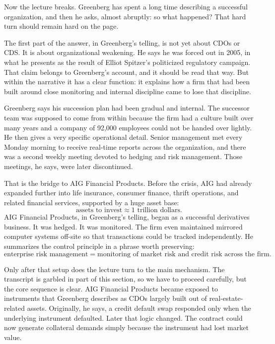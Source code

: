 Now the lecture breaks. Greenberg has spent a long time describing a successful organization, and then he asks, almost abruptly: so what happened? That hard turn should remain hard on the page.

The first part of the answer, in Greenberg's telling, is not yet about CDOs or CDS. It is about organizational weakening. He says he was forced out in 2005, in what he presents as the result of Elliot Spitzer's politicized regulatory campaign. That claim belongs to Greenberg's account, and it should be read that way. But within the narrative it has a clear function: it explains how a firm that had been built around close monitoring and internal discipline came to lose that discipline.

Greenberg says his succession plan had been gradual and internal. The successor team was supposed to come from within because the firm had a culture built over many years and a company of 92,000 employees could not be handed over lightly. He then gives a very specific operational detail. Senior management met every Monday morning to receive real-time reports across the organization, and there was a second weekly meeting devoted to hedging and risk management. Those meetings, he says, were later discontinued.

That is the bridge to AIG Financial Products. Before the crisis, AIG had already expanded further into life insurance, consumer finance, thrift operations, and related financial services, supported by a huge asset base:
\begin{equation}
\text{assets to invest} \approx 1\text{ trillion dollars}.
\end{equation}
AIG Financial Products, in Greenberg's telling, began as a successful derivatives business. It was hedged. It was monitored. The firm even maintained mirrored computer systems off-site so that transactions could be tracked independently. He summarizes the control principle in a phrase worth preserving:
\begin{equation}
\text{enterprise risk management}
=
\text{monitoring of market risk and credit risk across the firm}.
\end{equation}

Only after that setup does the lecture turn to the main mechanism. The transcript is garbled in part of this section, so we have to proceed carefully, but the core sequence is clear. AIG Financial Products became exposed to instruments that Greenberg describes as CDOs largely built out of real-estate-related assets. Originally, he says, a credit default swap responded only when the underlying instrument defaulted. Later that logic changed. The contract could now generate collateral demands simply because the instrument had lost market value.

